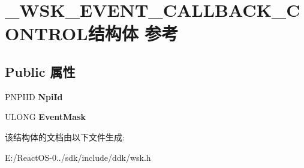 \hypertarget{struct___w_s_k___e_v_e_n_t___c_a_l_l_b_a_c_k___c_o_n_t_r_o_l}{}\section{\+\_\+\+W\+S\+K\+\_\+\+E\+V\+E\+N\+T\+\_\+\+C\+A\+L\+L\+B\+A\+C\+K\+\_\+\+C\+O\+N\+T\+R\+O\+L结构体 参考}
\label{struct___w_s_k___e_v_e_n_t___c_a_l_l_b_a_c_k___c_o_n_t_r_o_l}
\subsection*{Public 属性}
\begin{DoxyCompactItemize}
\item 
\mbox{\label{struct___w_s_k___e_v_e_n_t___c_a_l_l_b_a_c_k___c_o_n_t_r_o_l_a33c777e415d65a35576c73dda9adc45c}} 
P\+N\+P\+I\+ID {\bfseries Npi\+Id}
\item 
\mbox{\label{struct___w_s_k___e_v_e_n_t___c_a_l_l_b_a_c_k___c_o_n_t_r_o_l_ab0fdf1605a5495547ec165b10746da7e}} 
U\+L\+O\+NG {\bfseries Event\+Mask}
\end{DoxyCompactItemize}


该结构体的文档由以下文件生成\+:\begin{DoxyCompactItemize}
\item 
E\+:/\+React\+O\+S-\/0../sdk/include/ddk/wsk.\+h\end{DoxyCompactItemize}
